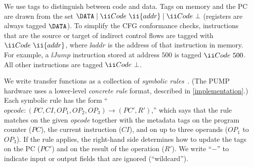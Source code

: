 \newcommand{\RULEWITHPREMISE}[9]{
\typicallabel{}
  \infrule{#7}{\ii{#1} : (#2, #3, #4, #5, #6) \to (#8,#9)}
\typicallabel{MkKey}
}

We use tags to distinguish between code and data.
%
Tags on memory and the PC are drawn from the set
%
$
\DATA \;|\; \CODE{\ii{addr}} \;|\; \CODE{\bot}
$
(registers are always tagged $\DATA$).
%
To simplify the CFG conformance checks, instructions that are the
source or target of indirect control flows are tagged with
$\CODE{\ii{addr}}$, where $\ii{addr}$ is the address of that
instruction in memory.
%
For example, a $\ii{Jump}$ instruction stored at address $500$ is
tagged $\CODE{500}$.
%
All other instructions are tagged $\CODE{\bot}$.
%

We write transfer functions as a collection of {\em
  symbolic rules}~\cite{popl2015, pump_hasp2014}.
%
(The PUMP hardware uses a lower-level {\em concrete rule} format,
described in \autoref{implementation}.)
%
Each symbolic rule has the form
%
%
\newcommand{\INLINERULE}[8]{\mathit{#1}
\mathrel{:}\allowbreak
 ({\mathit{#2}},\allowbreak{\mathit{#3}},\allowbreak{\mathit{#4}},\allowbreak{\mathit{#5}},\allowbreak{\mathit{#6}})
 \rightarrow\allowbreak ({\mathit{#7}},\allowbreak{\mathit{#8}})
}%
``$\INLINERULE{opcode}{PC}{CI}{OP_1}{OP_2}{OP_3}{PC'}{R'}$,''
%
which says that the rule matches on the given {\it opcode} together
with the metadata tags on the program counter ($\mathit{PC}$), the
current instruction ($\mathit{CI}$), and on up to three operands
($\mathit{OP_1}$ to $\mathit{OP_3}$).
%
If the rule applies, the right-hand side determines how to update the
tags on the PC ($\mathit{PC'}$) and on the result of the operation
($\mathit{R'}$).
%
We write ``$-$'' to indicate input or output fields that are ignored
(``wildcard'').
%
%
%

